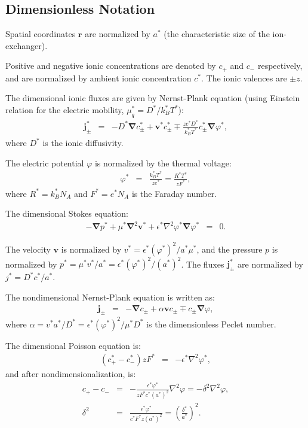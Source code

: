 \documentclass[final]{elsarticle}
\newcommand\eps \epsilon
\newcommand{\pars}[1]{\left(#1\right)}
\newcommand\Laplacian{\nabla^2}
\newcommand\bnabla{\boldsymbol{\nabla}}
\newcommand\bLaplacian{\boldsymbol{\nabla}^2}
\newcommand\bv{\boldsymbol{v}}
\newcommand\bj{\boldsymbol{j}}
\newcommand\br{\boldsymbol{r}}
\begin{document}
\subsection{Dimensionless Notation}

Spatial coordinates $\br$ are normalized by $a^*$ (the characteristic size of the ion-exchanger).

Positive and negative ionic concentrations are denoted by $c_+$ and $c_-$ respectively, and
are normalized by ambient ionic concentration $c^*$. The ionic valences are $\pm z$.

The dimensional ionic fluxes are given by Nernst-Plank equation 
(using Einstein relation for the electric mobility, $\mu_q^* = D^* / k_B^* T^*$):
\begin{eqnarray*}
\bj^*_\pm &=& 
-D^* \bnabla c^*_\pm + \bv^* c^*_\pm \mp \frac{z e^* D^*}{k_B^* T^*} c^*_\pm \bnabla \varphi^*,
\end{eqnarray*}
where $D^*$ is the ionic diffusivity.

The electric potential $\varphi$ is normalized by the thermal voltage:
\begin{eqnarray*}
\varphi^* &=& \frac{k_B^* T^*}{z e^*} = \frac{R^* T^*}{z F^*},
\end{eqnarray*}
where $R^* = k_B^* N_A$ and $F^* = e^* N_A$ is the Faraday number.

The dimensional Stokes equation:
\begin{eqnarray*}
-\bnabla p^* + \mu^* \bLaplacian \bv^* + \eps^* \Laplacian \varphi^* \bnabla \varphi^* &=& 0.
\end{eqnarray*}

The velocity $\bv$ is normalized by $v^* = {\eps^* (\varphi^*)^2}/{a^* \mu^*}$,
and the pressure $p$ is normalized by $p^* = {\mu^* v^*}/{a^*} = {\eps^* (\varphi^*)^2}/{(a^*)^2}$.
The fluxes $\bj^*_\pm$ are normalized by $j^* = {D^* c^*}/{a^*}$.

The nondimensional Nernst-Plank equation is written as:
\begin{eqnarray*}
\bj_\pm &=& 
-\bnabla c_\pm + \alpha \bv c_\pm \mp c_\pm \bnabla \varphi,
\end{eqnarray*}
where $\alpha = {v^* a^*}/{D^*} = {\eps^* (\varphi^*)^2}/{\mu^* D^*}$ 
is the dimensionless Peclet number.

The dimensional Poisson equation is:
\begin{eqnarray*}
(c^*_+ - c^*_-) z F^* &=& -\eps^* \Laplacian \varphi^*,
\end{eqnarray*}
and after nondimensionalization, is:
\begin{eqnarray*}
c_+ - c_- &=& -\frac{\eps^* \varphi^*}{z F^* c^* (a^*)^2} \Laplacian \varphi = 
-\delta^2 \Laplacian \varphi,
\\
\delta^2 &=& \frac{\eps^* \varphi^*}{c^* F^* z (a^*)^2} = 
\pars{\frac{\delta^*}{a^*}}^2.
\end{eqnarray*}
\end{document}

